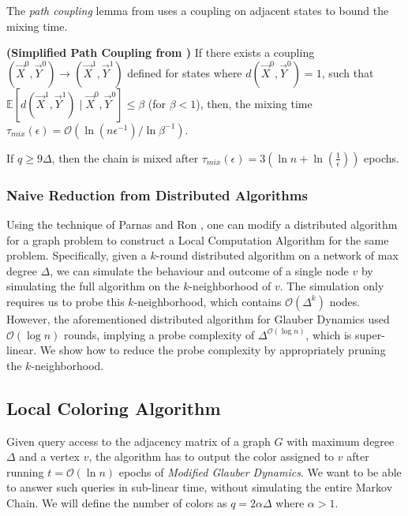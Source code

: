 The \emph{path coupling} lemma from \cite{path_coupling} uses a coupling on adjacent states to bound the mixing time.
\begin{lemma}
\label{lem:path_coupling}
\textbf{(Simplified Path Coupling from \cite{path_coupling})}
If there exists a coupling $(\vec X^0,\vec Y^0)\rightarrow(\vec X^1,\vec Y^1)$ defined for states where $d(\vec X^0, \vec Y^0) = 1$,
such that $\mathbb{E}[d(\vec X^1, \vec Y^1) \mid \vec X^0, \vec Y^0] \le \beta$ (for $\beta < 1$),
then, the mixing time $\tau_{mix}(\epsilon) = \mathcal O(\ln (n\epsilon^{-1})/\ln \beta^{-1})$.
\end{lemma}

\begin{corollary}
\label{cor:modified_mixing_time}
If $q\ge 9\Delta$, then the chain is mixed after $\tau_{mix}(\epsilon) = 3\left( \ln n + \ln(\frac1{\epsilon})\right)$ epochs.
\end{corollary}
\subsubsection{Naive Reduction from Distributed Algorithms}
\label{sec:naive_reduction_from_distributed_algorithms}
Using the technique of Parnas and Ron \cite{parnas_ron},
one can modify a distributed algorithm for a graph problem to construct a Local Computation Algorithm for the same problem.
Specifically, given a $k$-round distributed algorithm on a network of max degree $\Delta$,
we can simulate the behaviour and outcome of a single node $v$ by simulating the full algorithm on the $k$-neighborhood of $v$.
The simulation only requires us to probe this $k$-neighborhood, which contains $\mathcal O(\Delta^k)$ nodes.
However, the aforementioned distributed algorithm for Glauber Dynamics used $\mathcal O(\log n)$ rounds,
implying a probe complexity of $\Delta^{\mathcal O(\log n)}$, which is super-linear.
We show how to reduce the probe complexity by appropriately pruning the $k$-neighborhood.



\subsection{Local Coloring Algorithm}%
\label{sec:local_coloring_algortihm}
Given query access to the adjacency matrix of a graph $G$ with maximum degree $\Delta$ and a vertex $v$,
the algorithm has to output the color assigned to $v$ after running $t = \mathcal O(\ln n)$ epochs of \emph{Modified Glauber Dynamics}.
We want to be able to answer such queries in sub-linear time, without simulating the entire Markov Chain.
We will define the number of colors as $q = 2\alpha\Delta$ where $\alpha > 1$.

